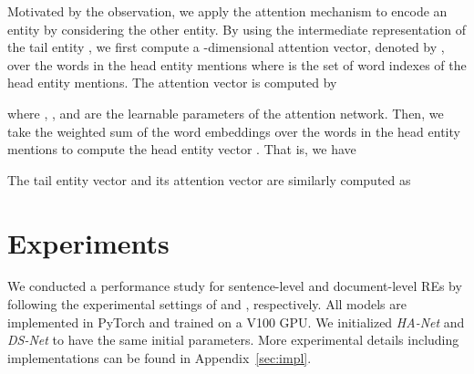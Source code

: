 \documentclass[11pt]{article}
\newcommand{\hanet}{\emph{HA-Net}\xspace}
\newcommand{\dsnet}{\emph{DS-Net}\xspace}
\begin{document}
Motivated by the observation, we apply the attention mechanism \cite{bahdanau2015neural} to encode an entity by considering the other entity.
By using the intermediate representation of the tail entity , we first compute a -dimensional attention vector, denoted by , over the words in the head entity mentions where  is the set of word indexes of the head entity mentions.
The attention vector is computed by

where , ,  and  are the learnable parameters of the attention network.
Then, we take the weighted sum of the word embeddings over the words in the head entity mentions to compute the head entity vector .
That is, we have




The tail entity vector   and its  attention vector  are similarly computed as















\iffalse
\subsection{A common structure of the modules}

\begin{figure}[tb]
	\texttt{[image: common\_module]}
	\caption{A common structure of the modules of our proposed model \label{fig:common_module}}
\end{figure}
\fi


 \section{Experiments}
We conducted a performance study for sentence-level and document-level REs by following the experimental settings of \cite{ye2019looking} and \cite{yao2019docred,wang2019fine}, respectively.
All models are implemented in PyTorch and trained on a V100 GPU.
We initialized \hanet and \dsnet to have the same initial parameters.
More experimental details including implementations can be found in Appendix~\ref{sec:impl}.
\end{document}
